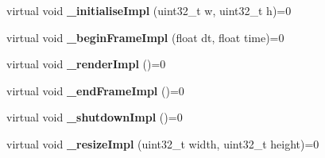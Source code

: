 \begin{DoxyCompactItemize}
\item 
\hypertarget{class_verdi_1_1_default_render_strategy_a78c152933acb42497685e5e99b37d553}{virtual void {\bfseries \-\_\-initialise\-Impl} (uint32\-\_\-t w, uint32\-\_\-t h)=0}\label{class_verdi_1_1_default_render_strategy_a78c152933acb42497685e5e99b37d553}

\item 
\hypertarget{class_verdi_1_1_default_render_strategy_a8403c3c69713244f36b5c52136cc2a92}{virtual void {\bfseries \-\_\-begin\-Frame\-Impl} (float dt, float time)=0}\label{class_verdi_1_1_default_render_strategy_a8403c3c69713244f36b5c52136cc2a92}

\item 
\hypertarget{class_verdi_1_1_default_render_strategy_ac28878bc4dbfa3ecd39ffdf198852478}{virtual void {\bfseries \-\_\-render\-Impl} ()=0}\label{class_verdi_1_1_default_render_strategy_ac28878bc4dbfa3ecd39ffdf198852478}

\item 
\hypertarget{class_verdi_1_1_default_render_strategy_a830d1272d8f9b78e348c22656d4d0907}{virtual void {\bfseries \-\_\-end\-Frame\-Impl} ()=0}\label{class_verdi_1_1_default_render_strategy_a830d1272d8f9b78e348c22656d4d0907}

\item 
\hypertarget{class_verdi_1_1_default_render_strategy_a7e0a0ffe33e16ac6d0ba293e964e04eb}{virtual void {\bfseries \-\_\-shutdown\-Impl} ()=0}\label{class_verdi_1_1_default_render_strategy_a7e0a0ffe33e16ac6d0ba293e964e04eb}

\item 
\hypertarget{class_verdi_1_1_default_render_strategy_ad3a9d3f1b0eebc4b845efe7b17846d40}{virtual void {\bfseries \-\_\-resize\-Impl} (uint32\-\_\-t width, uint32\-\_\-t height)=0}\label{class_verdi_1_1_default_render_strategy_ad3a9d3f1b0eebc4b845efe7b17846d40}

\end{DoxyCompactItemize}
